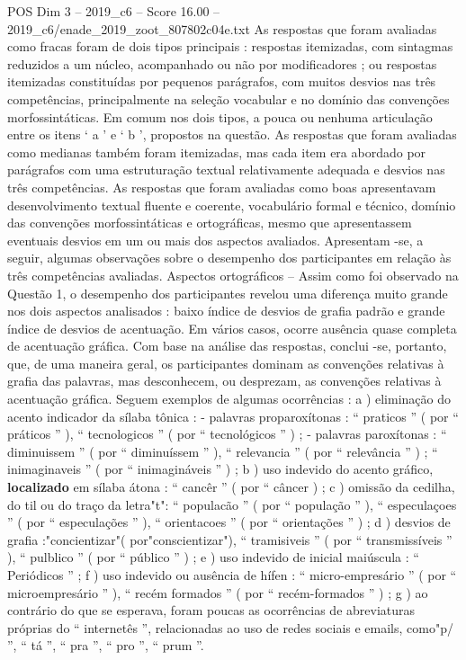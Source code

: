\begin{textsample}{POS Dim 3 – 2019\_c6 – Score 16.00 – 2019\_c6/enade\_2019\_zoot\_807802c04e.txt}
As respostas que foram avaliadas como fracas foram de dois tipos principais : respostas itemizadas, com sintagmas reduzidos a um núcleo, acompanhado ou não por modificadores ; ou respostas itemizadas constituídas por pequenos parágrafos, com muitos desvios nas três competências, principalmente na seleção vocabular e no domínio das convenções morfossintáticas.
Em comum nos dois tipos, a pouca ou nenhuma articulação entre os itens ‘ a ’ e ‘ b ’, propostos na questão.
As respostas que foram avaliadas como medianas também foram itemizadas, mas cada item era abordado por parágrafos com uma estruturação textual relativamente adequada e desvios nas três competências.
As respostas que foram avaliadas como boas apresentavam desenvolvimento textual fluente e coerente, vocabulário formal e técnico, domínio das convenções morfossintáticas e ortográficas, mesmo que apresentassem eventuais desvios em um ou mais dos aspectos avaliados.
Apresentam -se, a seguir, algumas observações sobre o desempenho dos participantes em relação às três competências avaliadas.
Aspectos ortográficos – Assim como foi observado na Questão 1, o desempenho dos participantes revelou uma diferença muito grande nos dois aspectos analisados : baixo índice de desvios de grafia padrão e grande índice de desvios de acentuação.
Em vários casos, ocorre ausência quase completa de acentuação gráfica.
Com base na análise das respostas, conclui -se, portanto, que, de uma maneira geral, os participantes dominam as convenções relativas à grafia das palavras, mas desconhecem, ou desprezam, as convenções relativas à acentuação gráfica.
Seguem exemplos de algumas ocorrências : a ) eliminação do acento indicador da sílaba tônica : - palavras proparoxítonas : “ praticos ” ( por “ práticos ” ), “ tecnologicos ” ( por “ tecnológicos ” ) ; - palavras paroxítonas : “ diminuissem ” ( por “ diminuíssem ” ), “ relevancia ” ( por “ relevância ” ) ; “ inimaginaveis ” ( por “ inimagináveis ” ) ; b ) uso indevido do acento gráfico, \textbf{localizado} em sílaba átona : “ cancêr ” ( por “ câncer ) ; c ) omissão da cedilha, do til ou do traço da letra"t": “ populacão ” ( por “ população ” ), “ especulaçoes ” ( por “ especulações ” ), “ orientacoes ” ( por “ orientações ” ) ; d ) desvios de grafia :"concientizar"( por"conscientizar"), “ tramisiveis ” ( por “ transmissíveis ” ), “ pulblico ” ( por “ público ” ) ; e ) uso indevido de inicial maiúscula : “ Periódicos ” ; f ) uso indevido ou ausência de hífen : “ micro-empresário ” ( por “ microempresário ” ), “ recém formados ” ( por “ recém-formados ” ) ; g ) ao contrário do que se esperava, foram poucas as ocorrências de abreviaturas próprias do “ internetês ”, relacionadas ao uso de redes sociais e emails, como"p/ ”, “ tá ”, “ pra ”, “ pro ”, “ prum ”.

\end{textsample}
